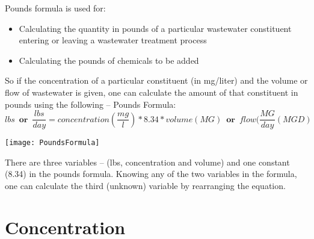 Pounds formula is used for:
\begin{itemize}
\item Calculating the quantity in pounds of a particular wastewater constituent entering or leaving a wastewater treatment process
\item Calculating the pounds of chemicals to be added\\
\end{itemize}
So if the concentration of a particular constituent (in mg/liter) and the volume or flow of wastewater is given, one can calculate the amount of that constituent in pounds using the following – Pounds Formula:
$$lbs \enspace \textbf{or} \enspace \frac{lbs}{day}=concentration(\frac{mg}{l})*8.34*volume(MG) \enspace \textbf{or} \enspace flow(\frac{MG}{day}(MGD)$$

\begin{center}
\texttt{[image: PoundsFormula]}
\end{center}

There are three variables – (lbs, concentration and volume) and one constant (8.34) in the pounds formula.  Knowing any of the two variables in the formula, one can calculate the third (unknown) variable by rearranging the equation.

\section{Concentration}

